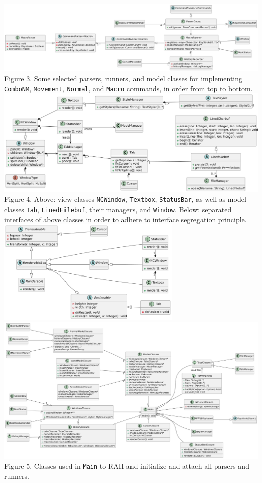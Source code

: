 \documentclass{article}
\begin{document}
\\\includegraphics[width=\textwidth]{uml6}
Figure 3. Some selected parsers, runners, and model classes 
for implementing \texttt{ComboNM}, \texttt{Movement}, 
\texttt{Normal}, and \texttt{Macro} commands, in order from top to bottom. 
\\\includegraphics[width=\textwidth]{uml7}
Figure 4. Above: view classes \texttt{NCWindow}, \texttt{Textbox}, \texttt{StatusBar}, 
as well as model classes \texttt{Tab}, \texttt{LinedFilebuf}, 
their managers, and \texttt{Window}. 
Below: separated interfaces of above classes 
in order to adhere to interface segregation principle. 
\\\includegraphics[width=250pt]{uml8}
\\\includegraphics[width=\textwidth]{uml9}
Figure 5. Classes used in \texttt{Main} to RAII and initialize and attach 
all parsers and runners. 
\end{document}
